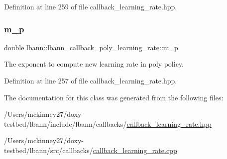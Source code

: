 Definition at line 259 of file callback\+\_\+learning\+\_\+rate.\+hpp.

\mbox{\label{classlbann_1_1lbann__callback__poly__learning__rate_a03c8c9a738036f9b778f11416112fd80}} 
\subsubsection{\texorpdfstring{m\+\_\+p}{m\_p}}
{\footnotesize\ttfamily double lbann\+::lbann\+\_\+callback\+\_\+poly\+\_\+learning\+\_\+rate\+::m\+\_\+p\hspace{0.3cm}{\ttfamily [private]}}



The exponent to compute new learning rate in poly policy. 



Definition at line 257 of file callback\+\_\+learning\+\_\+rate.\+hpp.



The documentation for this class was generated from the following files\+:\begin{DoxyCompactItemize}
\item 
/\+Users/mckinney27/doxy-\/testbed/lbann/include/lbann/callbacks/\hyperlink{callback__learning__rate_8hpp}{callback\+\_\+learning\+\_\+rate.\+hpp}\item 
/\+Users/mckinney27/doxy-\/testbed/lbann/src/callbacks/\hyperlink{callback__learning__rate_8cpp}{callback\+\_\+learning\+\_\+rate.\+cpp}\end{DoxyCompactItemize}
